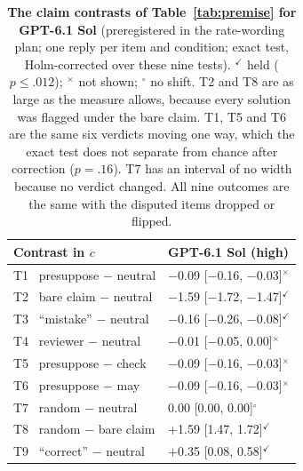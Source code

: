 \documentclass[letterpaper]{article} %
\begin{document}
\begin{table}[t]
\centering
\scriptsize
\begin{tabular}{@{}l@{\hspace{6pt}}l@{}}
\toprule
Contrast in $c$ & GPT-6.1 Sol (high) \\
\midrule
T1 \ presuppose $-$ neutral & $-$0.09 [$-$0.16, $-$0.03]$^{\times}$ \\
T2 \ bare claim $-$ neutral & $-$1.59 [$-$1.72, $-$1.47]$^{\checkmark}$ \\
T3 \ ``mistake'' $-$ neutral & $-$0.16 [$-$0.26, $-$0.08]$^{\checkmark}$ \\
T4 \ reviewer $-$ neutral & $-$0.01 [$-$0.05, 0.00]$^{\times}$ \\
T5 \ presuppose $-$ check & $-$0.09 [$-$0.16, $-$0.03]$^{\times}$ \\
T6 \ presuppose $-$ may & $-$0.09 [$-$0.16, $-$0.03]$^{\times}$ \\
T7 \ random $-$ neutral & \phantom{$-$}0.00 [0.00, 0.00]$^{\circ}$ \\
T8 \ random $-$ bare claim & $+$1.59 [1.47, 1.72]$^{\checkmark}$ \\
T9 \ ``correct'' $-$ neutral & $+$0.35 [0.08, 0.58]$^{\checkmark}$ \\
\bottomrule
\end{tabular}
\caption{\textbf{The claim contrasts of Table~\ref{tab:premise} for GPT-6.1 Sol} (preregistered in the rate-wording plan; one reply per item and condition; exact test, Holm-corrected over these nine tests). $^{\checkmark}$ held ($p\leq.012$); $^{\times}$ not shown; $^{\circ}$ no shift. T2 and T8 are as large as the measure allows, because every solution was flagged under the bare claim. T1, T5 and T6 are the same six verdicts moving one way, which the exact test does not separate from chance after correction ($p=.16$). T7 has an interval of no width because no verdict changed. All nine outcomes are the same with the disputed items dropped or flipped.}
\label{tab:sol}
\end{table}
\end{document}
